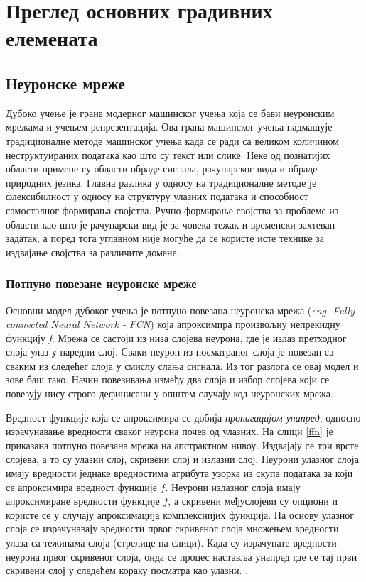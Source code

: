 \documentclass[11pt,oneside]{memoir}
\begin{document}
\chapter{Преглед основних градивних елемената}
\label{chp:razrada}

\section{Неуронске мреже}

Дубоко учење је грана модерног машинског учења која се бави неуронским мрежама и учењем репрезентација. 
Ова грана машинског учења надмашује традиционалне методе машинског учења када се ради са великом количином неструктуираних података
као што су текст или слике. 
Неке од познатијих области примене су области обраде сигнала, рачунарског вида и обраде природних језика. 
Главна разлика у односу на традиционалне методе је флексибилност у односу на структуру улазних података и
способност самосталног формирања својства. Ручно формирање својства за проблеме из области као што је рачунарски вид је за човека тежак
и временски захтеван задатак, а поред тога углавном није могуће да се користе исте технике за издвајање својства за различите домене.

\subsection{Потпуно повезане неуронске мреже}

Основни модел дубоког учења је потпуно повезана неуронска мрежа (\textit{eng. Fully connected Neural Network - FCN}) која
апроксимира произвољну непрекидну функцију \textit{f}. Мрежа се састоји из
низа слојева неурона, где је излаз претходног слоја улаз у наредни слој. Сваки неурон из посматраног слоја је
повезан са сваким из следећег слоја у смислу слања сигнала. Из тог разлога се овај модел и зове баш тако. 
Начин повезивања између два слоја и избор слојева који се повезују нису строго дефинисани у општем случају код неуронских мрежа. 

Вредност функције која 
се апроксимира се добија \textit{пропагацијом унапред}, односно израчунавање вредности сваког неурона почев од улазних. На слици 
\ref{ffn} је приказана потпуно повезана мрежа на апстрактном нивоу. Издвајају се три врсте слојева, а то су улазни слој,
скривени слој и излазни слој. Неурони улазног слоја имају вредности једнаке вредностима атрибута узорка из скупа података за који
се апроксимира вредност функције $f$. Неурони излазног слоја имају апроксимиране вредности функције $f$, а 
скривени међуслојеви су опциони и користе се у случају апроксимација комплекснијих функција. 
На основу улазног слоја се израчунавају вредности првог скривеног слоја множењем вредности улаза са тежинама слоја (стрелице
на слици). Када су израчунате
вредности неурона првог скривеног слоја, онда се процес наставља унапред где се тај први скривени слој у следећем кораку посматра као улазни.
\cite{deep_learning_goodfellow}.
\end{document}
